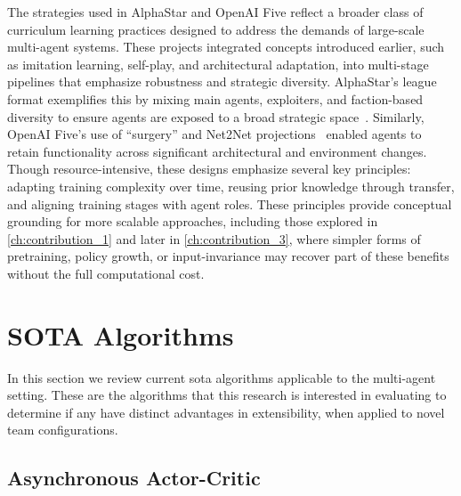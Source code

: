 The strategies used in AlphaStar and OpenAI Five reflect a broader class of curriculum 
learning practices designed to address the demands of large-scale multi-agent systems. 
These projects integrated concepts introduced earlier, such as imitation learning, self-play, 
and architectural adaptation, into multi-stage pipelines that emphasize robustness and 
strategic diversity. 
AlphaStar's league format exemplifies this by mixing main agents, exploiters, and faction-based 
diversity to ensure agents are exposed to a broad strategic space~\cite{vinyals2019}. 
Similarly, OpenAI Five's use of “surgery” and Net2Net projections~\cite{berner2019,chen2016} 
enabled agents to retain functionality across significant architectural and environment changes. 
Though resource-intensive, these designs emphasize several key principles: 
adapting training complexity over time, reusing prior knowledge through transfer, 
and aligning training stages with agent roles. 
These principles provide conceptual grounding for more scalable approaches, 
including those explored in \cref{ch:contribution_1} and later in \cref{ch:contribution_3}, 
where simpler forms of pretraining, policy growth, or input-invariance may recover 
part of these benefits without the full computational cost.




\section{SOTA Algorithms} 

In this section we review current \gls{sota} algorithms
applicable to the multi-agent setting.
These are the algorithms that this research is interested 
in evaluating to determine if any have distinct advantages
in extensibility, when applied to novel team configurations.


    \subsection*{Asynchronous Actor-Critic}

